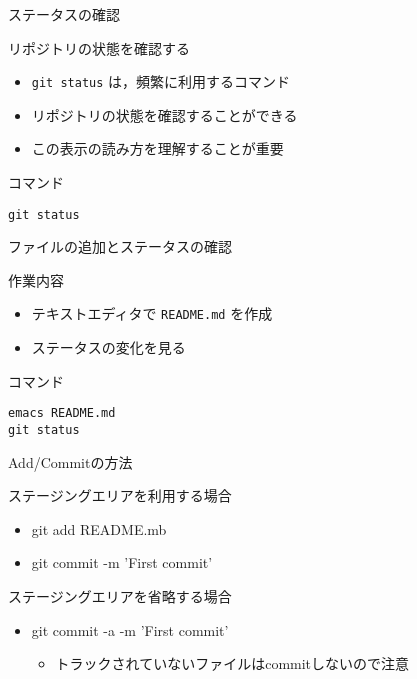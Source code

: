 \documentclass[t, aspectratio=169]{beamer}
\begin{document}
\begin{frame}[fragile,label=sec-2-3-2]{ステータスの確認}
 \begin{block}{リポジトリの状態を確認する}
\begin{itemize}
\item \texttt{git status} は，頻繁に利用するコマンド
\item リポジトリの状態を確認することができる
\item この表示の読み方を理解することが重要
\end{itemize}
\end{block}

\begin{block}{コマンド}
\begin{verbatim}
git status
\end{verbatim}
\end{block}
\end{frame}
\begin{frame}[fragile,label=sec-2-3-3]{ファイルの追加とステータスの確認}
 \begin{block}{作業内容}
\begin{itemize}
\item テキストエディタで \texttt{README.md} を作成
\item ステータスの変化を見る
\end{itemize}
\end{block}

\begin{block}{コマンド}
\begin{verbatim}
emacs README.md
git status
\end{verbatim}
\end{block}
\end{frame}
\begin{frame}[label=sec-2-3-4]{Add/Commitの方法}
\begin{block}{ステージングエリアを利用する場合}
\begin{itemize}
\item git add README.mb
\item git commit -m 'First commit'
\end{itemize}
\end{block}

\begin{block}{ステージングエリアを省略する場合}
\begin{itemize}
\item git commit -a -m 'First commit'
\begin{itemize}
\item トラックされていないファイルはcommitしないので注意
\end{itemize}
\end{itemize}
\end{block}
\end{frame}
\end{document}
